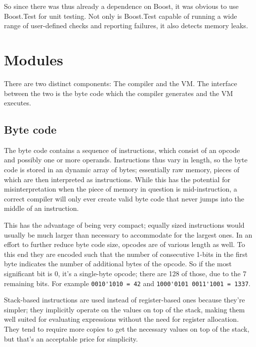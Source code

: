 		So since there was thus already a dependence on Boost, it was obvious to use Boost.Test for unit testing. Not only is Boost.Test capable of running a wide range of user-defined checks and reporting failures, it also detects memory leaks.
	
	
	\section{Modules}
	
		
		There are two distinct components: The compiler and the VM. The interface between the two is the byte code which the compiler generates and the VM executes.
		
		\subsection{Byte code}
			
			The byte code contains a sequence of instructions, which consist of an opcode and possibly one or more operands. Instructions thus vary in length, so the byte code is stored in an dynamic array of bytes; essentially raw memory, pieces of which are then interpreted as instructions. While this has the potential for misinterpretation when the piece of memory in question is mid-instruction, a correct compiler will only ever create valid byte code that never jumps into the middle of an instruction.
			
			This has the advantage of being very compact; equally sized instructions would usually be much larger than necessary to accommodate for the largest ones. In an effort to further reduce byte code size, opcodes are of various length as well. To this end they are encoded such that the number of consecutive 1-bits in the first byte indicates the number of additional bytes of the opcode. So if the most significant bit is 0, it's a single-byte opcode; there are 128 of those, due to the 7 remaining bits. For example \lstinline$0010'1010 = 42$ and \lstinline$1000'0101 0011'1001 = 1337$.
			
			Stack-based instructions are used instead of register-based ones because they're simpler; they implicitly operate on the values on top of the stack, making them well suited for evaluating expressions without the need for register allocation. They tend to require more copies to get the necessary values on top of the stack, but that's an acceptable price for simplicity.
			
